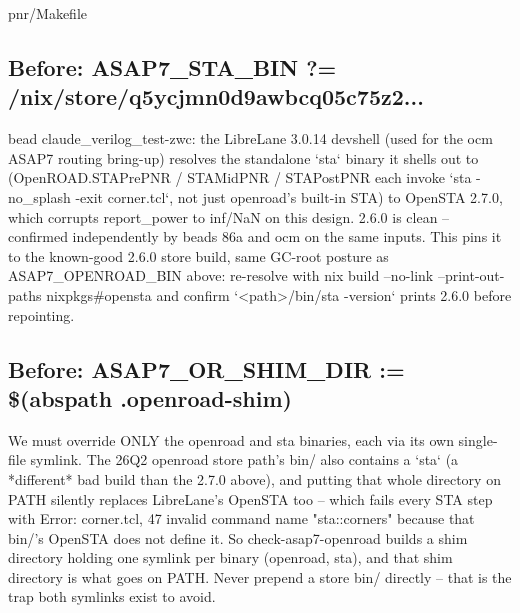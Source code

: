 \begin{relocated}{pnr/Makefile}

\subsection*{Before: ASAP7\_STA\_BIN       ?= /nix/store/q5ycjmn0d9awbcq05c75z2...}

\begin{textblock}
bead claude_verilog_test-zwc: the LibreLane 3.0.14 devshell (used for the
ocm ASAP7 routing bring-up) resolves the standalone `sta` binary it shells
out to (OpenROAD.STAPrePNR / STAMidPNR / STAPostPNR each invoke
`sta -no_splash -exit corner.tcl`, not just openroad's built-in STA) to
OpenSTA 2.7.0, which corrupts report_power to inf/NaN on this design.
2.6.0 is clean -- confirmed independently by beads 86a and ocm on the same
inputs. This pins it to the known-good 2.6.0 store build, same GC-root
posture as ASAP7_OPENROAD_BIN above: re-resolve with
  nix build --no-link --print-out-paths nixpkgs#opensta
and confirm `<path>/bin/sta -version` prints 2.6.0 before repointing.
\end{textblock}

\subsection*{Before: ASAP7\_OR\_SHIM\_DIR   := \$(abspath .openroad-shim)}

\begin{textblock}
We must override ONLY the openroad and sta binaries, each via its own
single-file symlink. The 26Q2 openroad store path's bin/ also contains a
`sta` (a *different* bad build than the 2.7.0 above), and putting that
whole directory on PATH silently replaces LibreLane's OpenSTA too -- which
fails every STA step with
  Error: corner.tcl, 47 invalid command name "sta::corners"
because that bin/'s OpenSTA does not define it. So check-asap7-openroad
builds a shim directory holding one symlink per binary (openroad, sta),
and that shim directory is what goes on PATH. Never prepend a store bin/
directly -- that is the trap both symlinks exist to avoid.


\end{textblock}
\end{relocated}
